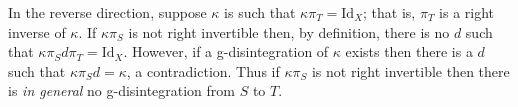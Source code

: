 In the reverse direction, suppose $\kappa$ is such that $\kappa \pi_T=\mathrm{Id}_X$; that is, $\pi_T$ is a right inverse of $\kappa$. If $\kappa \pi_S$ is not right invertible then, by definition, there is no $d$ such that $\kappa \pi_S d \pi_T = \mathrm{Id}_X$. However, if a g-disintegration of $\kappa$ exists then there is a $d$ such that $\kappa \pi_S d = \kappa$, a contradiction. Thus if $\kappa \pi_S$ is not right invertible then there is \emph{in general} no g-disintegration from $S$ to $T$.






